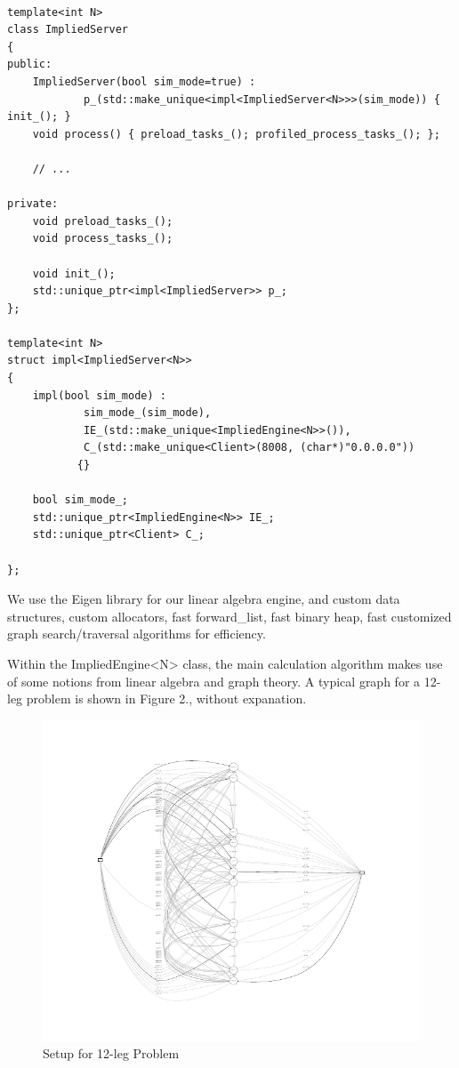\documentclass{article}
\begin{document}
\begin{verbatim}

template<int N>
class ImpliedServer
{
public:
    ImpliedServer(bool sim_mode=true) :
            p_(std::make_unique<impl<ImpliedServer<N>>>(sim_mode)) { init_(); }
    void process() { preload_tasks_(); profiled_process_tasks_(); };

    // ...

private:
    void preload_tasks_();
    void process_tasks_();

    void init_();
    std::unique_ptr<impl<ImpliedServer>> p_;
};

template<int N>
struct impl<ImpliedServer<N>>
{
    impl(bool sim_mode) :
            sim_mode_(sim_mode),
            IE_(std::make_unique<ImpliedEngine<N>>()),
            C_(std::make_unique<Client>(8008, (char*)"0.0.0.0"))
           {}

    bool sim_mode_;
    std::unique_ptr<ImpliedEngine<N>> IE_;
    std::unique_ptr<Client> C_;

};

\end{verbatim}

We use the Eigen library for our linear algebra engine, and custom data structures, custom allocators, fast forward{\_}list, fast binary heap, fast customized  graph search/traversal algorithms for efficiency.

Within the ImpliedEngine<N> class, the main calculation algorithm makes use of some notions from linear algebra and graph theory. A typical graph for a 12-leg problem is shown in Figure 2., without expanation.

\begin{figure}
\includegraphics[scale=1.25]{test_case.pdf}
\caption{Setup for 12-leg Problem}
\end{figure}
\end{document}
